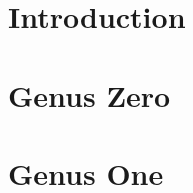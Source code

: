\documentclass{article}
\begin{document}
\section{Introduction}
\label{sec:Introduction}






\section{Genus Zero}
\label{sec:Genus Zero}
    
\section{Genus One}
\label{sec:Genus One}







\end{document}
